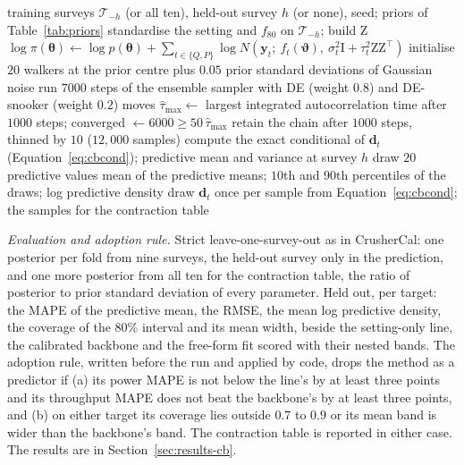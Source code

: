 \begin{algorithm}[!t]
\caption{One CrusherBayes posterior and its held-out prediction (\texttt{hp500/\allowbreak{}crusherbayes.py}, \texttt{\_fit}).}
\label{alg:crusherbayes}
\begin{algorithmic}[1]
\Require training surveys $\mathcal T_{-h}$ (or all ten), held-out survey $h$ (or none), seed; priors of Table~\ref{tab:priors}
\State standardise the setting and $f_{80}$ on $\mathcal T_{-h}$; build $\mathrm Z$
\State $\log\pi(\boldsymbol\theta)\gets\log p(\boldsymbol\theta)+\sum_{t\in\{Q,P\}}\log N\!\left(\mathbf y_t;\ f_t(\boldsymbol\vartheta),\ \sigma_t^2\mathrm I+\tau_t^2\mathrm Z\mathrm Z^{\top}\right)$ 
\State initialise $20$ walkers at the prior centre plus $0.05$ prior standard deviations of Gaussian noise
\State run $7000$ steps of the ensemble sampler with DE (weight $0.8$) and DE-snooker (weight $0.2$) moves
\State $\hat\tau_{\max}\gets$ largest integrated autocorrelation time after $1000$ steps; converged $\gets 6000\ge50\,\hat\tau_{\max}$
\State retain the chain after $1000$ steps, thinned by $10$ ($12{,}000$ samples)
    \State compute the exact conditional of $\mathbf d_t$ (Equation~\eqref{eq:cbcond}); predictive mean and variance at survey $h$
    \State draw $20$ predictive values
  \EndFor
  \State \Return mean of the predictive means; $10$th and $90$th percentiles of the draws; log predictive density
\Else
  \State draw $\mathbf d_t$ once per sample from Equation~\eqref{eq:cbcond}; \Return the samples for the contraction table
\EndIf
\end{algorithmic}
\end{algorithm}

\emph{Evaluation and adoption rule.} Strict leave-one-survey-out as in CrusherCal: one posterior per fold from nine surveys, the held-out survey only
in the prediction, and one more posterior from all ten for the contraction table, the ratio of posterior to prior standard deviation of every
parameter. Held out, per target: the MAPE of the predictive mean, the RMSE, the mean log predictive density, the coverage of the $80\%$ interval and
its mean width, beside the setting-only line, the calibrated backbone and the free-form fit scored with their nested bands. The adoption rule,
written before the run and applied by code, drops the method as a predictor if (a) its power MAPE is not below the line's by at least three points
and its throughput MAPE does not beat the backbone's by at least three points, and (b) on either target its coverage lies outside $0.7$ to $0.9$ or
its mean band is wider than the backbone's band. The contraction table is reported in either case. The results are in
Section~\ref{sec:results-cb}.

